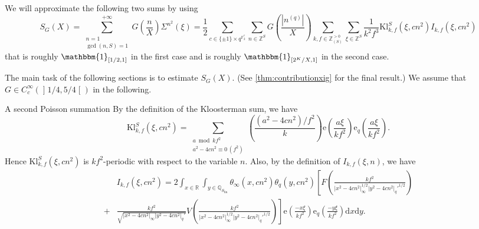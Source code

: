 \documentclass[10pt,oneside,reqno]{amsart}
\makeatletter
\newcommand\lopen{\mathopen{]}}
\newcommand\ropen{\mathclose{[}}
\newcommand\rmd{\mathrm{d}}
\newcommand\rme{\mathrm{e}}
\newcommand\FF{\mathbb{F}}
\newcommand\QQ{\mathbb{Q}}
\newcommand\RR{\mathbb{R}}
\newcommand\ZZ{\mathbb{Z}}
\newcommand\triv{\mathbbm{1}}
\newcommand\fin{\mathrm{fin}}
\newcommand\Kl{\mathrm{Kl}}
\newcommand\legendresymbol[2]{\genfrac{(}{)}{}{}{#1}{#2}}
\def\subsection{\@startsection{subsection}{2}%
  \z@{3pt\@plus0pt}{-.5em}%
  {\normalfont\bfseries}}
\theoremstyle{THEOREM}
\theoremstyle{DEFINITION}
\theoremstyle{EXERCISE}
\numberwithin{equation}{section}
\makeatother
\begin{document}
We will approximate the following two sums by using 
\[
S_G(X)=\sum_{\substack{n=1\\\gcd(n,S)=1}}^{+\infty}G\legendresymbol{n}{X}\Sigma^{n^2}(\xi)= \frac12 \sum_{c\in \{\pm 1\}\times q^{\FF_2^r}}\sum_{n\in \ZZ^S}G\legendresymbol{|n^{(q)}|}{X}\sum_{k,f\in \ZZ_{(S)}^{>0}}\sum_{\xi\in \ZZ^S}\frac{1}{k^2f^3}\Kl_{k,f}^S(\xi,cn^2)I_{k,f}(\xi,cn^2)
\]
that is roughly $\triv_{[1/2,1]}$ in the first case and is roughly $\triv_{[2^K/X,1]}$ in the second case. 

The main task of the following sections is to estimate $S_G(X)$. (See \autoref{thm:contributionxig} for the final result.) We assume that $G\in C_c^\infty(\lopen 1/4,5/4\ropen)$ in the following.

\subsection{A second Poisson summation}\label{subsec:secondpoisson}
By the definition of the Kloosterman sum, we have
\[
\Kl_{k,f}^S(\xi,cn^2)=
  \sum_{\substack{a \bmod kf^2\\ a^2-4cn^2\equiv 0\,(f^2)}}\legendresymbol{(a^2-4cn^2)/f^2}{k}\rme\legendresymbol{a\xi}{kf^2}\rme_{q}\legendresymbol{a\xi}{kf^2}.
\]
Hence $\Kl_{k,f}^S(\xi,cn^2)$ is $kf^2$-periodic with respect to the variable $n$. Also, by the definition of $I_{k,f}(\xi,n)$, we have
\begin{align*}
&I_{k,f}(\xi,cn^2)=2\int_{x\in\RR}\int_{y\in\QQ_{S_\fin}}\theta_\infty(x,cn^2)\theta_{q}(y, cn^2)\left[F\legendresymbol{kf^2}{|x^2-4cn^2|_\infty^{1/2}|y^2-4cn^2|_q'^{1/2}}\right.\\
+&\left.\frac{kf^2}{\sqrt{|x^2-4cn^2|_\infty|y^2- 4cn^2|_q'}}V\legendresymbol{kf^2}{|x^2-4cn^2|_\infty^{1/2}|y^2- 4cn^2|_q'^{1/2}}\right]\rme\legendresymbol{-x\xi}{kf^2}\rme_{q}\legendresymbol{-y\xi}{kf^2}\rmd x\rmd y.
\end{align*}
\end{document}
